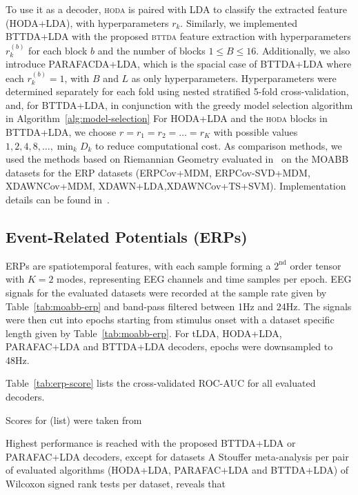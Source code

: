 \documentclass[twocolumn]{article}
\begin{document}
To use it as a decoder, \textsc{hoda} is paired with LDA to classify the
extracted feature (HODA+LDA), with hyperparameters $r_k$.
Similarly, we implemented BTTDA+LDA with the proposed \textsc{bttda} feature
extraction with hyperparameters $r_k^{(b)}$ for each block $b$ and the number of blocks
$1\leq B\leq16$.
Additionally, we also introduce PARAFACDA+LDA, which is the spacial case of
BTTDA+LDA where each $r_k^{(b)}=1$, with $B$ and $L$ as only hyperparameters.
Hyperparameters were determined separately for each fold using nested
stratified 5-fold cross-validation, and, for BTTDA+LDA, in conjunction with the
greedy model selection algorithm in Algorithm~\ref{alg:model-selection}
For HODA+LDA and the \textsc{hoda} blocks in BTTDA+LDA, we choose
$r=r_1=r_2=\ldots=r_K$ with possible values $1,2,4,8,\ldots,\min_kD_k$
to reduce computational cost.
As comparison methods, we used the methods based on
Riemannian Geometry evaluated in~\cite{Chevallier2024} on
the MOABB datasets for the ERP datasets (ERPCov+MDM, ERPCov-SVD+MDM,
XDAWNCov+MDM, XDAWN+LDA,XDAWNCov+TS+SVM).
Implementation details can be found in~\cite{Chevallier2024}.

\subsection{Event-Related Potentials (ERPs)}
ERPs are spatiotemporal features, with each sample forming a $2^\text{nd}$
order tensor with $K=2$ modes, representing EEG channels and time samples
per epoch.
EEG signals for the evaluated datasets were recorded at the sample rate given
by Table~\ref{tab:moabb-erp} and band-pass filtered between 1Hz
and 24Hz.
The signals were then cut into epochs starting from stimulus onset with a
dataset specific length given by Table~\ref{tab:moabb-erp}.
For tLDA, HODA+LDA, PARAFAC+LDA and BTTDA+LDA decoders, epochs were downsampled to 48Hz.

Table~\ref{tab:erp-score} lists the cross-validated ROC-AUC for all evaluated
decoders.
\begin{table*}
  \footnotesize
  
  \caption{Scores for (list) were taken from \cite{Chevallier2024}}
  \label{tab:erp-score}
\end{table*}
Highest performance is reached with the proposed BTTDA+LDA or PARAFAC+LDA
decoders, except for datasets
A Stouffer meta-analysis per pair of evaluated algorithms (HODA+LDA, PARAFAC+LDA and
BTTDA+LDA) of Wilcoxon signed rank tests per dataset, reveals that
\end{document}
